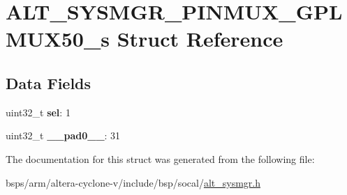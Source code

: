 \hypertarget{structALT__SYSMGR__PINMUX__GPLMUX50__s}{}\section{A\+L\+T\+\_\+\+S\+Y\+S\+M\+G\+R\+\_\+\+P\+I\+N\+M\+U\+X\+\_\+\+G\+P\+L\+M\+U\+X50\+\_\+s Struct Reference}
\label{structALT__SYSMGR__PINMUX__GPLMUX50__s}
\subsection*{Data Fields}
\begin{DoxyCompactItemize}
\item 
\mbox{\label{structALT__SYSMGR__PINMUX__GPLMUX50__s_a4d6a7c43f675128adaef770084a861a6}} 
uint32\+\_\+t {\bfseries sel}\+: 1
\item 
\mbox{\label{structALT__SYSMGR__PINMUX__GPLMUX50__s_ab85cad0bdd560e012f61ae434c77feea}} 
uint32\+\_\+t {\bfseries \+\_\+\+\_\+pad0\+\_\+\+\_\+}\+: 31
\end{DoxyCompactItemize}


The documentation for this struct was generated from the following file\+:\begin{DoxyCompactItemize}
\item 
bsps/arm/altera-\/cyclone-\/v/include/bsp/socal/\mbox{\hyperlink{alt__sysmgr_8h}{alt\+\_\+sysmgr.\+h}}\end{DoxyCompactItemize}
